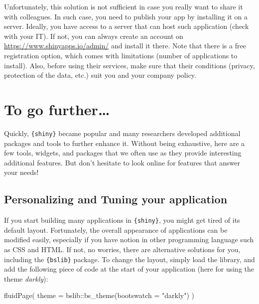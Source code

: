 \documentclass[
]{book}
\newenvironment{Shaded}{\begin{snugshade}}{\end{snugshade}}
\newcommand{\AttributeTok}[1]{\textcolor[rgb]{0.77,0.63,0.00}{#1}}
\newcommand{\FunctionTok}[1]{\textcolor[rgb]{0.00,0.00,0.00}{#1}}
\newcommand{\NormalTok}[1]{#1}
\newcommand{\SpecialCharTok}[1]{\textcolor[rgb]{0.00,0.00,0.00}{#1}}
\newcommand{\StringTok}[1]{\textcolor[rgb]{0.31,0.60,0.02}{#1}}
\begin{document}
Unfortunately, this solution is not sufficient in case you really want to share it with colleagues. In such case, you need to publish your app by installing it on a server. Ideally, you have access to a server that can host such application (check with your IT). If not, you can always create an account on \url{https://www.shinyapps.io/admin/} and install it there. Note that there is a free registration option, which comes with limitations (number of applications to install). Also, before using their services, make sure that their conditions (privacy, protection of the data, etc.) suit you and your company policy.

\hypertarget{to-go-further-2}{%
\section{To go further\ldots{}}\label{to-go-further-2}}

Quickly, \texttt{\{shiny\}} became popular and many researchers developed additional packages and tools to further enhance it. Without being exhaustive, here are a few tools, widgets, and packages that we often use as they provide interesting additional features. But don't hesitate to look online for features that answer your needs!

\hypertarget{personalizing-and-tuning-your-application}{%
\subsection{Personalizing and Tuning your application}\label{personalizing-and-tuning-your-application}}

If you start building many applications in \texttt{\{shiny\}}, you might get tired of its default layout. Fortunately, the overall appearance of applications can be modified easily, especially if you have notion in other programming language such as CSS and HTML. If not, no worries, there are alternative solutions for you, including the \texttt{\{bslib\}} package.
To change the layout, simply load the library, and add the following piece of code at the start of your application (here for using the theme \emph{darkly}):

\begin{Shaded}
\begin{Highlighting}[]
\FunctionTok{fluidPage}\NormalTok{(}
  \AttributeTok{theme =}\NormalTok{ bslib}\SpecialCharTok{::}\FunctionTok{bs\_theme}\NormalTok{(}\AttributeTok{bootswatch =} \StringTok{"darkly"}\NormalTok{)}
\NormalTok{)}
\end{Highlighting}
\end{Shaded}
\end{document}
